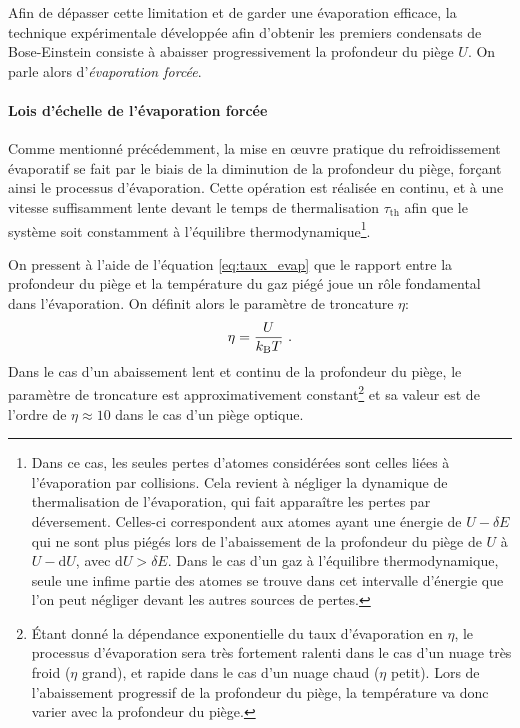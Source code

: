 Afin de dépasser cette limitation et de garder une évaporation efficace, la technique expérimentale développée afin d'obtenir les premiers condensats de Bose-Einstein consiste à abaisser progressivement la profondeur du piège $U$. On parle alors d'\emph{évaporation forcée}.





\paragraph*{Lois d'échelle de l'évaporation forcée}
Comme mentionné précédemment, la mise en œuvre pratique du refroidissement évaporatif se fait par le biais de la diminution de la profondeur du piège, forçant ainsi le processus d'évaporation. Cette opération est réalisée en continu, et à une vitesse suffisamment lente devant le temps de thermalisation $\tau_{\mathrm{th}}$ afin que le système soit constamment à l'équilibre thermodynamique\footnote{Dans ce cas, les seules pertes d'atomes considérées sont celles liées à l'évaporation par collisions. Cela revient à négliger la dynamique de thermalisation de l'évaporation, qui fait apparaître les pertes par déversement\citep{cohen1996atomes}. Celles-ci correspondent aux atomes ayant une énergie de $U-\delta E$ qui ne sont plus piégés lors de l'abaissement de la profondeur du piège de $U$ à $U-\mathrm{d}U$, avec $\mathrm{d}U > \delta E$. Dans le cas d'un gaz à l'équilibre thermodynamique, seule une infime partie des atomes se trouve dans cet intervalle d'énergie que l'on peut négliger devant les autres sources de pertes.}. 


On pressent à l'aide de l'équation \ref{eq:taux_evap} que le rapport entre la profondeur du piège et la température du gaz piégé joue un rôle fondamental dans l'évaporation. On définit alors le paramètre de troncature $\eta$:
\begin{equation}
\eta=\frac{U}{k_{\mathrm{B}} T} \text{ .}
\end{equation}
Dans le cas d'un abaissement lent et continu de la profondeur du piège, le paramètre de troncature est approximativement constant\footnote{Étant donné la dépendance exponentielle du taux d'évaporation en $\eta$, le processus d'évaporation sera très fortement ralenti dans le cas d'un nuage très froid ($\eta$ grand), et rapide dans le cas d'un nuage chaud ($\eta$ petit). Lors de l'abaissement progressif de la profondeur du piège, la température va donc varier avec la profondeur du piège.} et sa valeur est de l'ordre de $\eta\approx 10$ dans le cas d'un piège optique.



